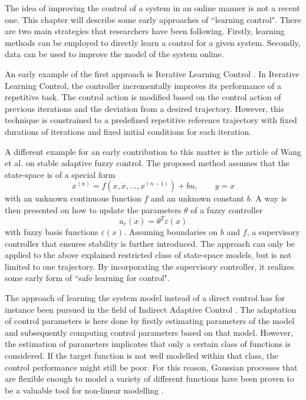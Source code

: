 \documentclass[../main.tex]{subfiles}
\begin{document}
The idea of improving the control of a system in an online manner is not a recent one. This chapter will describe some early approaches of ``learning control". There are two main strategies that researchers have been following. Firstly, learning methods can be employed to directly learn a control for a given system. Secondly, data can be used to improve the model of the system online.\par

An early example of the first approach is Iterative Learning Control \cite{aastrom2013adaptive}. In Iterative Learning Control, the controller incrementally improves its performance of a repetitive task. The control action is modified based on the control action of previous iterations and the deviation from a desired trajectory. However, this technique is constrained to a predefined repetitive reference trajectory with fixed durations of iterations and fixed initial conditions for each iteration.

A different example for an early contribution to this matter is the article of Wang et al. \cite{wang1993stable} on stable adaptive fuzzy control. The proposed method assumes that the state-space is of a special form
\begin{equation}
    x^{(n)} = f(x, \dot{x}, ..., x^{(n-1)})+bu, \qquad y=x
\end{equation}
with an unknown continuous function $f$ and an unknown constant $b$. A way is then presented on how to update the parameters $\theta$ of a fuzzy controller
\begin{equation}
    u_c(x) = \theta^T \varepsilon(x)
\end{equation}
with fuzzy basis functions $\varepsilon(x)$. Assuming boundaries on $b$ and $f$, a supervisory controller that ensures stability is further introduced. The approach can only be applied to the above explained restricted class of state-space models, but is not limited to one trajectory. By incorporating the supervisory controller, it realizes some early form of ``safe learning for control".\par


The approach of learning the system model instead of a direct control has for instance been pursued in the field of Indirect Adaptive Control \cite{aastrom2013adaptive}. The adaptation of control parameters is here done by firstly estimating parameters of the model and subsequently computing control parameters based on that model. However, the estimation of parameters implicates that only a certain class of functions is considered. If the target function is not well modelled within that class, the control performance might still be poor. For this reason, Gaussian processes that are flexible enough to model a variety of different functions have been proven to be a valuable tool for non-linear modelling \cite{murphy2012machine}.\par
\end{document}
